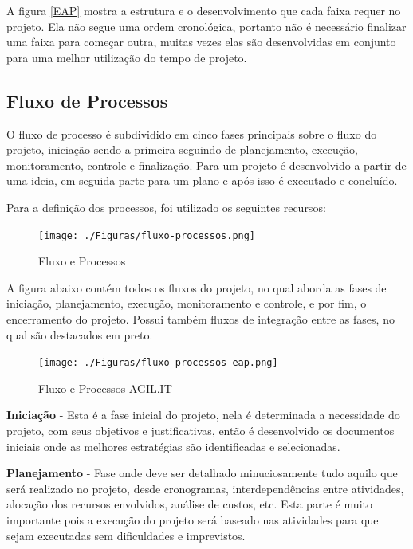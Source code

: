 A figura \ref{EAP} mostra a estrutura e o desenvolvimento que cada faixa requer no projeto. Ela não segue uma ordem cronológica, portanto não é necessário finalizar uma faixa para começar outra, muitas vezes elas são desenvolvidas em conjunto para uma melhor utilização do tempo de projeto.


\subsection{Fluxo de Processos}

{O fluxo de processo é subdividido em cinco fases principais sobre o fluxo do projeto, iniciação sendo a primeira seguindo de planejamento, execução, monitoramento, controle e finalização. Para \cite{PMG2018} um projeto é desenvolvido a partir de uma ideia, em seguida parte para um plano e após isso é executado e concluído.}

Para a definição dos processos, foi utilizado os seguintes recursos:

\begin{figure}[H]
	\caption{\label{Fluxo-Processos}Fluxo e Processos}
	\begin{center}
		\texttt{[image: ./Figuras/fluxo-processos.png]}
	\end{center}
\end{figure}



A figura abaixo contém todos os fluxos do projeto, no qual aborda as fases de iniciação, planejamento, execução, monitoramento e controle, e por fim, o encerramento do projeto. Possui também fluxos de integração entre as fases, no qual são destacados em preto.

\begin{figure}[H]
	\caption{\label{Fluxo-Processos-eap}Fluxo e Processos AGIL.IT}
	\begin{center}
		\texttt{[image: ./Figuras/fluxo-processos-eap.png]}
	\end{center}
\end{figure}



\textbf{Iniciação} - Esta é a fase inicial do projeto, nela é determinada a necessidade do projeto, com seus objetivos e justificativas, então é desenvolvido os documentos iniciais onde as melhores estratégias são identificadas e selecionadas.

\textbf{Planejamento} - Fase onde deve ser detalhado minuciosamente tudo aquilo que será realizado no projeto, desde cronogramas, interdependências entre atividades, alocação dos recursos envolvidos, análise de custos, etc. Esta parte é muito importante pois a execução do projeto será baseado nas atividades para que sejam executadas sem dificuldades e imprevistos.

